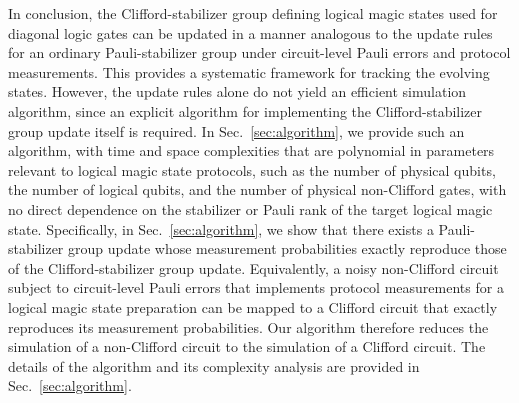 \documentclass[
 reprint,
 amsmath,amssymb,
 pra,superscriptaddress, nofootinbib
]{revtex4-2}
\theoremstyle{definition}
\theoremstyle{plain}
\begin{document}
In conclusion, the Clifford-stabilizer group defining logical magic states used for diagonal logic gates can be updated in a manner analogous to the update rules for an ordinary Pauli-stabilizer group under circuit-level Pauli errors and protocol measurements.
This provides a systematic framework for tracking the evolving states. However, the update rules alone do not yield an efficient simulation algorithm, since an explicit algorithm for implementing the Clifford-stabilizer group update itself is required. In Sec.~\ref{sec:algorithm}, we provide such an algorithm, with time and space complexities that are polynomial in parameters relevant to logical magic state protocols, such as the number of physical qubits, the number of logical qubits, and the number of physical non-Clifford gates, with no direct dependence on the stabilizer or Pauli rank of the target logical magic state.
Specifically, in Sec.~\ref{sec:algorithm}, we show that there exists a Pauli-stabilizer group update whose measurement probabilities exactly reproduce those of the Clifford-stabilizer group update. Equivalently, a noisy non-Clifford circuit subject to circuit-level Pauli errors that implements protocol measurements for a logical magic state preparation can be mapped to a Clifford circuit that exactly reproduces its measurement probabilities. 
Our algorithm therefore reduces the simulation of a non-Clifford circuit to the simulation of a Clifford circuit. 
The details of the algorithm and its complexity analysis are provided in Sec.~\ref{sec:algorithm}.
\end{document}

